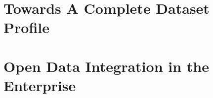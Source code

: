 \documentclass[a4paper,11pt,twoside]{ThesisStyle}
\begin{document}
\part{Towards A Complete Dataset Profile} \label{part:dataset_profiling}







\let\cleardoublepage\clearpage
\part{Open Data Integration in the Enterprise} \label{part:data_integration}









\appendix









\chapter*{}
\chaptermark{}
\vspace{-15ex}
\end{document}
